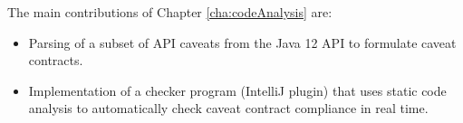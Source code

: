\noindent
The main contributions of Chapter \ref{cha:codeAnalysis} are:
\begin{itemize}
	\item Parsing of a subset of API caveats from the Java 12 API to formulate caveat contracts.
	\item Implementation of a checker program (IntelliJ plugin) that uses static code analysis to automatically check caveat contract compliance in real time.
\end{itemize}